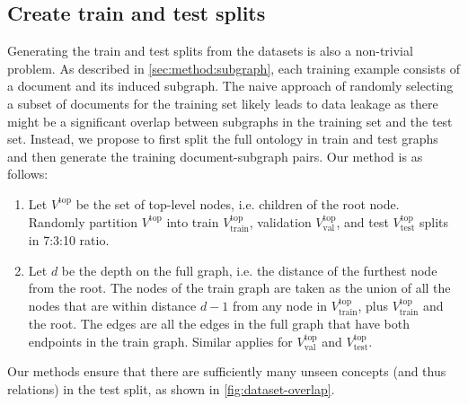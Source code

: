 
\subsection{Create train and test splits}



Generating the train and test splits from the datasets is also a non-trivial problem. As described in \cref{sec:method:subgraph}, each training example consists of a document and its induced subgraph. The naive approach of randomly selecting a subset of documents for the training set likely leads to data leakage as there might be a significant overlap between subgraphs in the training set and the test set. Instead, we propose to first split the full ontology in train and test graphs and then generate the training document-subgraph pairs. Our method is as follows:
\begin{enumerate}
    \item Let $V^\text{top}$ be the set of top-level nodes, i.e. children of the root node. Randomly partition $V^\text{top}$ into train $V^\text{top}_{\text{train}}$, validation $V^\text{top}_{\text{val}}$, and test $V^\text{top}_{\text{test}}$ splits in 7:3:10 ratio.
    \item Let $d$ be the depth on the full graph, i.e. the distance of the furthest node from the root. The nodes of the train graph are taken as the union of all the nodes that are within distance $d - 1$ from any node in $V^\text{top}_\text{train}$, plus $V_\text{train}^\text{top}$ and the root. The edges are all the edges in the full graph that have both endpoints in the train graph. Similar applies for $V^\text{top}_\text{val}$ and $V^\text{top}_\text{test}$.
\end{enumerate}
Our methods ensure that there are sufficiently many unseen concepts (and thus relations) in the test split, as shown in \cref{fig:dataset-overlap}.

